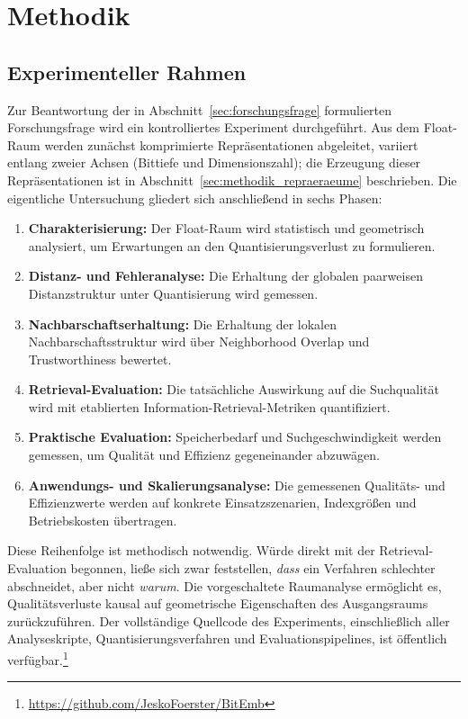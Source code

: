 \chapter{Methodik}
\label{chap:methodik}
%
\section{Experimenteller Rahmen}
%
Zur Beantwortung der in Abschnitt~\ref{sec:forschungsfrage} formulierten Forschungsfrage wird ein kontrolliertes Experiment durchgeführt.
Aus dem Float-Raum werden zunächst komprimierte Repräsentationen abgeleitet, variiert entlang zweier Achsen (Bittiefe und Dimensionszahl); die Erzeugung dieser Repräsentationen ist in Abschnitt~\ref{sec:methodik_repraeraeume} beschrieben.
Die eigentliche Untersuchung gliedert sich anschließend in sechs Phasen:
\begin{enumerate}
  \item \textbf{Charakterisierung:} Der Float-Raum wird statistisch und geometrisch analysiert, um Erwartungen an den Quantisierungsverlust zu formulieren.
  \item \textbf{Distanz- und Fehleranalyse:} Die Erhaltung der globalen paarweisen Distanzstruktur unter Quantisierung wird gemessen.
  \item \textbf{Nachbarschaftserhaltung:} Die Erhaltung der lokalen Nachbarschaftsstruktur wird über Neighborhood Overlap und Trustworthiness bewertet.
  \item \textbf{Retrieval-Evaluation:} Die tatsächliche Auswirkung auf die Suchqualität wird mit etablierten Information-Retrieval-Metriken quantifiziert.
  \item \textbf{Praktische Evaluation:} Speicherbedarf und Suchgeschwindigkeit werden gemessen, um Qualität und Effizienz gegeneinander abzuwägen.
  \item \textbf{Anwendungs- und Skalierungsanalyse:} Die gemessenen Qualitäts- und Effizienzwerte werden auf konkrete Einsatzszenarien, Indexgrößen und Betriebskosten übertragen.
\end{enumerate}
%
Diese Reihenfolge ist methodisch notwendig.
Würde direkt mit der Retrieval-Evaluation begonnen, ließe sich zwar feststellen, \emph{dass} ein Verfahren schlechter abschneidet, aber nicht \emph{warum}.
Die vorgeschaltete Raumanalyse ermöglicht es, Qualitätsverluste kausal auf geometrische Eigenschaften des Ausgangsraums zurückzuführen.
%
Der vollständige Quellcode des Experiments, einschließlich aller Analyseskripte, Quantisierungsverfahren und Evaluationspipelines, ist öffentlich verfügbar.\footnote{\url{https://github.com/JeskoFoerster/BitEmb}}
%
